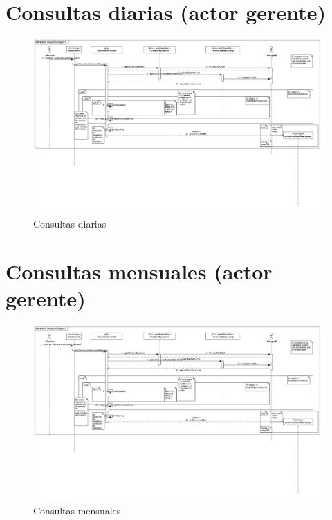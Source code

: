 \newpage
\section{Consultas diarias (actor gerente)}
\begin{figure}[htbp!]
		\centering
			\includegraphics[width=1\textwidth]{uml/DiagramasSecuencia/RubenMurga/getConsultasDia}
		\caption{Consultas diarias}
	\end{figure}

\newpage
\section{Consultas mensuales (actor gerente)}

\begin{figure}[htbp!]
		\centering
			\includegraphics[width=1\textwidth]{uml/DiagramasSecuencia/RubenMurga/getConsultasMes}
		\caption{Consultas mensuales}
	\end{figure}

\newpage
